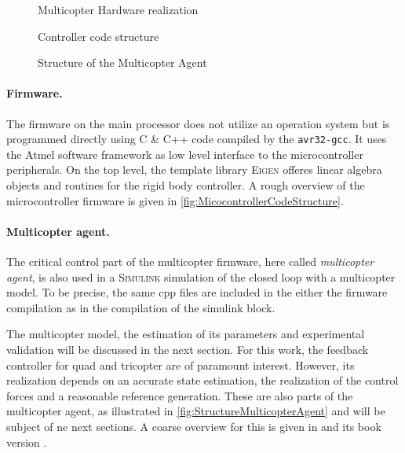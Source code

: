\begin{figure}[p]
 \centering
 \footnotesize
 \newcommand{\macGroundstation}{\textcolor{white}{\textbf{Groundstation} (Win7 PC)}}
 \newcommand{\macMulticopterRealization}{\textcolor{white}{\textbf{Multicopter}}}
 \newcommand{\macRBSI}{\textcolor{white}{\textbf{rigid}}}
 \newcommand{\macRBSII}{\textcolor{white}{\textbf{body}}}
 \newcommand{\macRBSIII}{\textcolor{white}{\textbf{system}}}
 \newcommand{\macMCI}{\textcolor{white}{\textbf{main}}}
 \newcommand{\macMCII}{\textcolor{white}{\textbf{controller}}}
 
 \vspace{-2mm}
 \caption{Multicopter Hardware realization}
 \label{fig:MulticopterRealizationOverview}
 \vspace{5mm}
 
 \vspace{-1mm}
 \caption{Controller code structure}
 \label{fig:MicocontrollerCodeStructure}
 \vspace{5mm}
 \footnotesize
 
 \caption{Structure of the Multicopter Agent}
 \label{fig:StructureMulticopterAgent}
\end{figure}


\paragraph{Firmware.}
The firmware on the main processor does not utilize an operation system but is programmed directly using C \& C++ code compiled by the \texttt{avr32-gcc}.
It uses the Atmel software framework as low level interface to the microcontroller peripherals.
On the top level, the template library \textsc{Eigen} offeres linear algebra objects and routines for the rigid body controller.
A rough overview of the microcontroller firmware is given in \autoref{fig:MicocontrollerCodeStructure}.

\paragraph{Multicopter agent.}
The critical control part of the multicopter firmware, here called \textit{multicopter agent}, is also used in a \textsc{Simulink} simulation of the closed loop with a multicopter model.
To be precise, the same cpp files are included in the either the firmware compilation as in the compilation of the simulink block. 

The multicopter model, the estimation of its parameters and experimental validation will be discussed in the next section.
For this work, the feedback controller for quad and tricopter are of paramount interest.
However, its realization depends on an accurate state estimation, the realization of the control forces and a reasonable reference generation.
These are also parts of the multicopter agent, as illustrated in \autoref{fig:StructureMulticopterAgent} and will be subject of ne next sections.
A coarse overview for this is given in  \cite{Konz:Mechatronics} and its book version \cite{Konz:MechatronicsBook}.